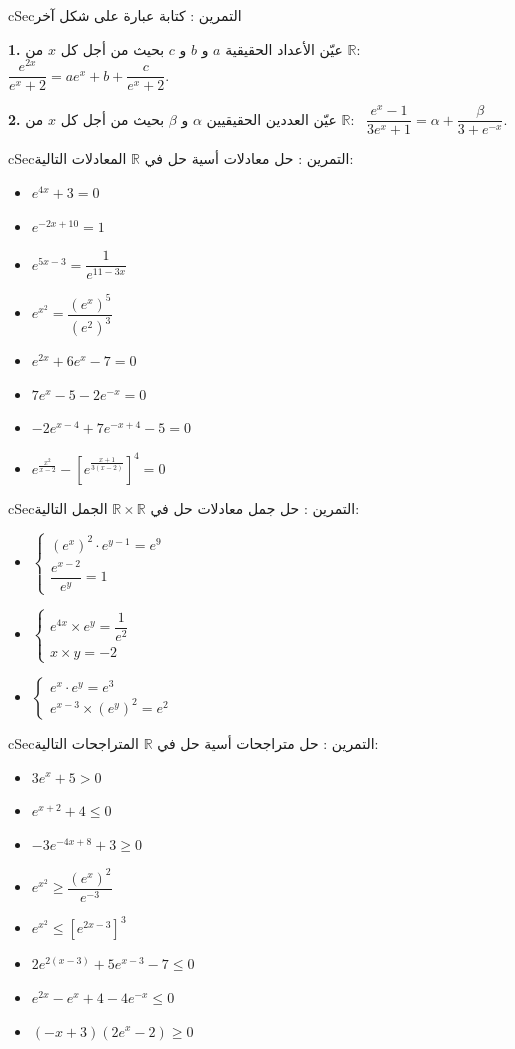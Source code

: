 \documentclass[12pt,a4paper]{article}
\newenvironment{BOX}[2]{\begin{otherlanguage}{english}\begin{arbox}{#1}{#2}}{\end{arbox}\end{otherlanguage}}
\newcounter{exo}
\newenvironment{tamrin}[1]{\stepcounter{exo}\begin{BOX}{cSec}{التمرين \theexo: #1}}{\end{BOX}}
\newcommand{\R}{\mathbb{R}}
\newenvironment{sq}{\begin{itemize}[leftmargin=2.4em,itemsep=3pt]}{\end{itemize}}
\newcommand{\qa}{\item[(أ)]}\newcommand{\qb}{\item[(ب)]}\newcommand{\qc}{\item[(جـ)]}\newcommand{\qd}{\item[(د)]}\newcommand{\qe}{\item[(هـ)]}
\newcommand{\QQ}[1]{\par\smallskip\textbf{#1.} }
\begin{document}
\begin{tamrin}{كتابة عبارة على شكل آخر}
\QQ{1} عيّن الأعداد الحقيقية $a$ و $b$ و $c$ بحيث من أجل كل $x$ من $\R$: \ $\dfrac{e^{2x}}{e^{x}+2}=ae^{x}+b+\dfrac{c}{e^{x}+2}$.
\QQ{2} عيّن العددين الحقيقيين $\alpha$ و $\beta$ بحيث من أجل كل $x$ من $\R$: \ $\dfrac{e^{x}-1}{3e^{x}+1}=\alpha+\dfrac{\beta}{3+e^{-x}}$.
\end{tamrin}

\begin{tamrin}{حل معادلات أسية}
حل في $\R$ المعادلات التالية:
\begin{sq}
\qa $e^{4x}+3=0$
\qb $e^{-2x+10}=1$
\qc $e^{5x-3}=\dfrac{1}{e^{11-3x}}$
\qd $e^{x^{2}}=\dfrac{\left(e^{x}\right)^{5}}{\left(e^{2}\right)^{3}}$
\qe $e^{2x}+6e^{x}-7=0$
\item[(و)] $7e^{x}-5-2e^{-x}=0$
\item[(ز)] $-2e^{x-4}+7e^{-x+4}-5=0$
\item[(ح)] $e^{\frac{x^{2}}{x-2}}-\left[e^{\frac{x+1}{3(x-2)}}\right]^{4}=0$
\end{sq}
\end{tamrin}

\begin{tamrin}{حل جمل معادلات}
حل في $\R\times\R$ الجمل التالية:
\begin{sq}
\qa $\left\{\begin{array}{l}\left(e^{x}\right)^{2}\cdot e^{y-1}=e^{9}\\[4pt] \dfrac{e^{x-2}}{e^{y}}=1\end{array}\right.$
\qb $\left\{\begin{array}{l}e^{4x}\times e^{y}=\dfrac{1}{e^{2}}\\[4pt] x\times y=-2\end{array}\right.$
\qc $\left\{\begin{array}{l}e^{x}\cdot e^{y}=e^{3}\\[2pt] e^{x-3}\times\left(e^{y}\right)^{2}=e^{2}\end{array}\right.$
\end{sq}
\end{tamrin}

\begin{tamrin}{حل متراجحات أسية}
حل في $\R$ المتراجحات التالية:
\begin{sq}
\qa $3e^{x}+5>0$
\qb $e^{x+2}+4\leqslant0$
\qc $-3e^{-4x+8}+3\geqslant0$
\qd $e^{x^{2}}\geqslant\dfrac{\left(e^{x}\right)^{2}}{e^{-3}}$
\qe $e^{x^{2}}\leqslant\left[e^{2x-3}\right]^{3}$
\item[(و)] $2e^{2(x-3)}+5e^{x-3}-7\leqslant0$
\item[(ز)] $e^{2x}-e^{x}+4-4e^{-x}\leqslant0$
\item[(ح)] $(-x+3)\left(2e^{x}-2\right)\geqslant0$
\end{sq}
\end{tamrin}
\end{document}
